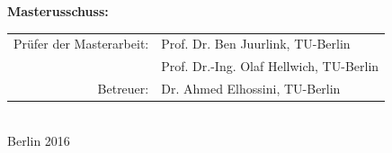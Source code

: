 \begin{titlepage}
\begin{center}
    \large \textbf{Masterusschuss:}

    \vspace{.2cm}

		\begin{tabular}{rl}
		Pr\"ufer der Masterarbeit:	& Prof. Dr. Ben Juurlink, TU-Berlin\\
						& Prof. Dr.-Ing. Olaf Hellwich, TU-Berlin\\
		Betreuer: & Dr. Ahmed Elhossini, TU-Berlin\\
		\end{tabular}\\

    \vspace{0.5cm}
    \large Berlin 2016\\

  \end{center}
\end{titlepage}
